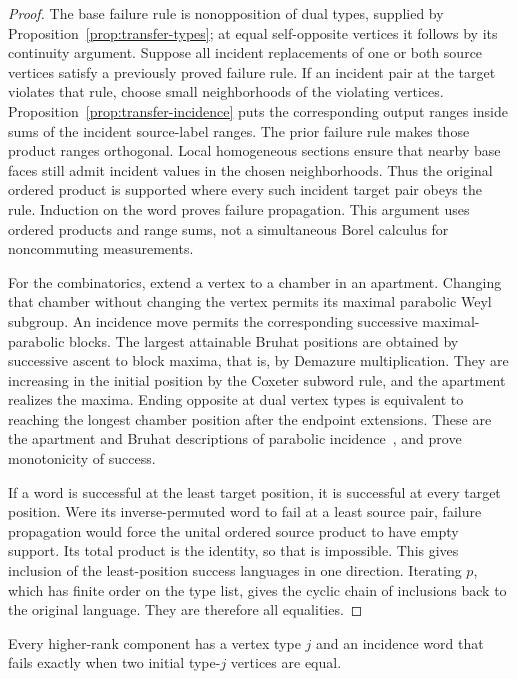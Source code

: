 \begin{proof}
The base failure rule is nonopposition of dual types, supplied by
Proposition~\ref{prop:transfer-types}; at equal self-opposite vertices
it follows by its continuity argument. Suppose all incident
replacements of one or both source vertices satisfy a previously
proved failure rule. If an incident pair at the target violates that
rule, choose small neighborhoods of the violating vertices.
Proposition~\ref{prop:transfer-incidence} puts the corresponding output
ranges inside sums of the incident source-label ranges. The prior
failure rule makes those product ranges orthogonal. Local homogeneous
sections ensure that nearby base faces still admit incident values
in the chosen neighborhoods. Thus the original ordered product is
supported where every such incident target pair obeys the rule.
Induction on the word proves failure propagation. This argument uses
ordered products and range sums, not a simultaneous Borel calculus
for noncommuting measurements.

For the combinatorics, extend a vertex to a chamber in an apartment.
Changing that chamber without changing the vertex permits its maximal
parabolic Weyl subgroup. An incidence move permits the corresponding
successive maximal-parabolic blocks. The largest attainable Bruhat
positions are obtained by successive ascent to block maxima, that
is, by Demazure multiplication. They are increasing in the initial
position by the Coxeter subword rule, and the apartment realizes the
maxima. Ending opposite at dual vertex types is equivalent to
reaching the longest chamber position after the endpoint extensions.
These are the apartment and Bruhat descriptions of parabolic
incidence~\cite{Borel1991,Tits1964}, and prove monotonicity of success.

If a word is successful at the least target position, it is successful
at every target position. Were its inverse-permuted word to fail at
a least source pair, failure propagation would force the unital
ordered source product to have empty support. Its total product is
the identity, so that is impossible. This gives inclusion of the
least-position success languages in one direction. Iterating $p$,
which has finite order on the type list, gives the cyclic chain of
inclusions back to the original language. They are therefore all
equalities.
\end{proof}

\begin{lemma}
\label{lem:transfer-inequality-word}
Every higher-rank component has a vertex type $j$ and an incidence
word that fails exactly when two initial type-$j$ vertices are equal.
\end{lemma}

